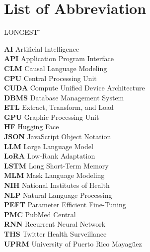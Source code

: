 

\chapter*{List of Abbreviation}

 \noindent
\vspace{-1.75\baselineskip}
  \begin{tabbing}
LONGEST \=  \kill %

\textbf{AI} \> Artificial Intelligence\\
\textbf{API} \> Application Program Interface\\
\textbf{CLM} \> Causal Language Modeling\\
\textbf{CPU} \> Central Processing Unit\\
\textbf{CUDA} \> Compute Unified Device Architecture\\
\textbf{DBMS} \> Database Management System\\
\textbf{ETL} \> Extract, Transform, and Load \\
\textbf{GPU} \> Graphic Processing Unit\\
\textbf{HF} \> Hugging Face\\
\textbf{JSON} \> JavaScript Object Notation\\
\textbf{LLM} \> Large Language Model\\
\textbf{LoRA} \> Low-Rank Adaptation\\
\textbf{LSTM} \> Long Short-Term Memory\\
\textbf{MLM} \> Mask Language Modeling\\
\textbf{NIH} \> National Institutes of Health\\
\textbf{NLP} \> Natural Language Processing\\
\textbf{PEFT} \> Parameter Efficient Fine-Tuning\\
\textbf{PMC} \> PubMed Central\\
\textbf{RNN} \> Recurrent Neural Network\\
\textbf{THS} \> Twitter Health Surveillance\\
\textbf{UPRM} \> University of Puerto Rico Mayag\"uez\\


\end{tabbing}